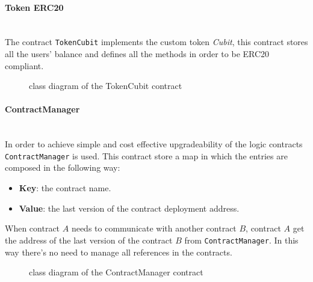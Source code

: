 \paragraph{Token ERC20}\mbox{}\\

\noindent The contract \texttt{TokenCubit} implements the custom token \textit{Cubit}, this contract stores all the users' balance and defines all the methods in order to be ERC20 compliant.
\begin{figure}[H]
	\centering
	\caption{class diagram of the TokenCubit contract}
\end{figure}

\paragraph{ContractManager}\mbox{}\\ 

\noindent In order to achieve simple and cost effective upgradeability of the logic contracts \texttt{ContractManager} is used. This contract store a map in which the entries are composed in the following way:
\begin{itemize}
	\item\textbf{Key}: the contract name.
	\item\textbf{Value}: the last version of the contract deployment address.
\end{itemize}
When contract $A$ needs to communicate with another contract $B$, contract $A$ get the address of the last version of the contract $B$ from \texttt{ContractManager}. In this way there's no need to manage all references in the contracts. 
\begin{figure}[H]
	\centering
	\caption{class diagram of the ContractManager contract}
\end{figure}
\pagebreak
